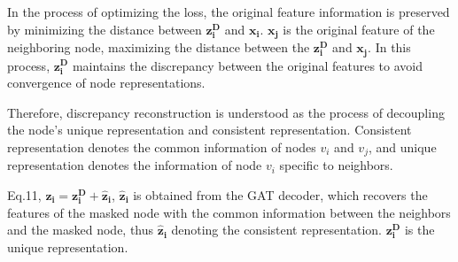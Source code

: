 \documentclass[sigconf]{acmart}
\begin{document}
In the process of optimizing the loss, the original feature information is preserved by minimizing the distance between  $\mathbf{z_i^D}$ and $\mathbf{x_i}$.  $\mathbf{x_j}$  is the original feature of the neighboring node, maximizing the distance between the $\mathbf{z_i^D}$ and $\mathbf{x_j}$. In this process,  $\mathbf{z_i^D}$ maintains the discrepancy between the original features to avoid convergence of node representations.

Therefore, discrepancy reconstruction is understood as the process of decoupling the node's unique representation and consistent representation. Consistent representation denotes the common information of nodes $v_i$ and $v_j$, and unique representation denotes the information of node  $v_i$ specific to neighbors. 

Eq.11, $\mathbf{z_i}= \mathbf{z_i^D} +\mathbf{\hat{z}_i}$,   $\mathbf{\hat{z}_i}$ is obtained from the GAT decoder, which recovers the features of the masked node with the common information between the neighbors and the masked node, thus $\mathbf{\hat{z}_i}$ denoting the consistent representation. $\mathbf{z_i^D}$ is the unique representation.


\end{document}
